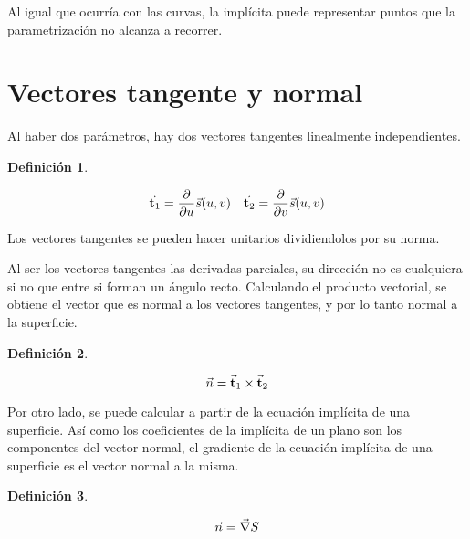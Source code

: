\documentclass[a5paper,12pt,twoside]{book}
\newtheorem{defn}{{Definición}}[chapter]
\begin{document}
Al igual que ocurría con las curvas, la implícita puede representar puntos que la parametrización no alcanza a recorrer.


\section{Vectores tangente y normal}

Al haber dos parámetros, hay dos vectores tangentes linealmente independientes.

\begin{mdframed}[style=MyFrame1]
    \begin{defn}
    \end{defn}
    \begin{equation*}
        \Vec{\textbf{t}}_1 = \frac{\partial}{\partial u} \Vec{s}(u,v)
        \quad
        \Vec{\textbf{t}}_2 = \frac{\partial}{\partial v} \Vec{s}(u,v)
    \end{equation*}
\end{mdframed}

Los vectores tangentes se pueden hacer unitarios dividiendolos por su norma.

Al ser los vectores tangentes las derivadas parciales, su dirección no es cualquiera si no que entre si forman un ángulo recto. Calculando el producto vectorial, se obtiene el vector que es normal a los vectores tangentes, y por lo tanto normal a la superficie.

\begin{mdframed}[style=MyFrame1]
    \begin{defn}
    \end{defn}
    \begin{equation*}
        \Vec{n} = \Vec{\textbf{t}}_1 \times \Vec{\textbf{t}}_2
    \end{equation*}
\end{mdframed}

Por otro lado, se puede calcular a partir de la ecuación implícita de una superficie. Así como los coeficientes de la implícita de un plano son los componentes del vector normal, el gradiente de la ecuación implícita de una superficie es el vector normal a la misma.

\begin{mdframed}[style=MyFrame1]
    \begin{defn}
    \end{defn}
    \begin{equation*}
        \Vec{n} = \Vec{\nabla} S
    \end{equation*}
\end{mdframed}
\end{document}
